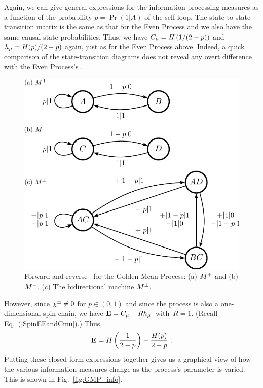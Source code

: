 Again, we can give general expressions for the information processing measures as a function
of the probability $p = \Pr(1|A)$ of the self-loop. The state-to-state
transition matrix is the same as that for the Even Process and we also have
the same causal state probabilities. Thus, we have
$C_\mu = H \left( 1/(2-p) \right)$ and $h_\mu = H(p)/(2-p)$ again, 
just as for the Even Process above. 
Indeed, a quick comparison of the state-transition diagrams does not
reveal any overt difference with the Even Process's \eMs.

\begin{figure}[th]
\centering
\includegraphics[scale=\figscale]{../chapter2/figures/GMP}
\caption{
  Forward and reverse \eMs\ for the Golden Mean Process: (a) ${M}^{+}$ and
  (b) ${M}^{-}$. (c) The bidirectional machine ${M}^{\pm}$.
  }
\label{fig:GMP}
\end{figure}

However, since $\chi^{\pm} \neq 0$ for $p \in (0,1)$ and since the process is also a
one-dimensional spin chain, we have \mbox{${\bf E} = C_\mu - R h_\mu$ with $R = 1$}.
(Recall Eq.~(\ref{SpinEEandCmu}).) Thus,
\begin{equation}
{\bf E} = H \left( \frac{1}{2-p} \right) - \frac{H(p)}{2-p} ~.
\end{equation}
Putting these closed-form expressions together gives us a
graphical view of how the various information measures change as
the process's parameter is varied. This is shown in Fig.~\ref{fig:GMP_info}.

